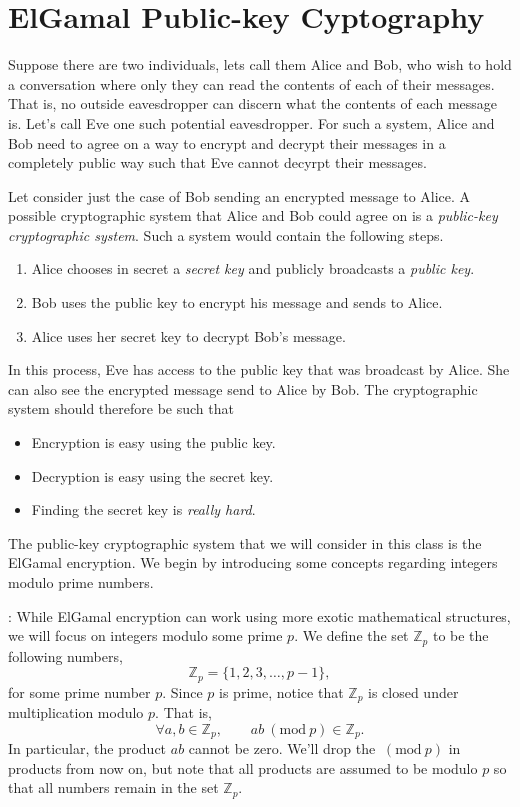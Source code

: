 \documentclass{article}
\newcommand{\pad}{\vspace{8pt}\noindent}
\newcommand{\Mod}[1]{\ (\mathrm{mod}\ #1)}
\begin{document}
\newpage

\section*{ElGamal Public-key Cyptography}

Suppose there are two individuals, lets call them Alice and Bob, who wish to hold a conversation where only they can read the contents of each of their messages. That is, no outside eavesdropper can discern what the contents of each message is. Let's call Eve one such potential eavesdropper. For such a system, Alice and Bob need to agree on a way to encrypt and decrypt their messages in a completely public way such that Eve cannot decyrpt their messages.

Let consider just the case of Bob sending an encrypted message to Alice. A possible cryptographic system that Alice and Bob could agree on is a {\em public-key cryptographic system}. Such a system would contain the following steps.
\begin{enumerate}
\item Alice chooses in secret a {\em secret key} and publicly broadcasts a {\em public key}.
\item Bob uses the public key to encrypt his message and sends to Alice.
\item Alice uses her secret key to decrypt Bob's message.
\end{enumerate}
In this process, Eve has access to the public key that was broadcast by Alice. She can also see the encrypted message send to Alice by Bob. The cryptographic system should therefore be such that 
\begin{itemize}
\item Encryption is easy using the public key.
\item Decryption is easy using the secret key.
\item Finding the secret key is {\em really hard}.
\end{itemize}
The public-key cryptographic system that we will consider in this class is the ElGamal encryption. We begin by introducing some concepts regarding integers modulo prime numbers. 

\pad {\bf Integers Modulo Primes}: 
While ElGamal encryption can work using more exotic mathematical structures, we will focus on integers modulo some prime $p$. We define the set $\mathbb{Z}_p$ to be the following numbers,
\[
\mathbb{Z}_p = \{1,2,3,\ldots,p-1\},
\]
for some prime number $p$. Since $p$ is prime, notice that $\mathbb{Z}_p$ is closed under multiplication modulo $p$. That is, 
\[
\forall  a, b\in \mathbb{Z}_p, \qquad ab\Mod{p} \in \mathbb{Z}_p.
\]
In particular, the product $ab$ cannot be zero. We'll drop the $\Mod{p}$ in products from now on, but note that all products are assumed to be modulo $p$ so that all numbers remain in the set $\mathbb{Z}_p$.
\end{document}
